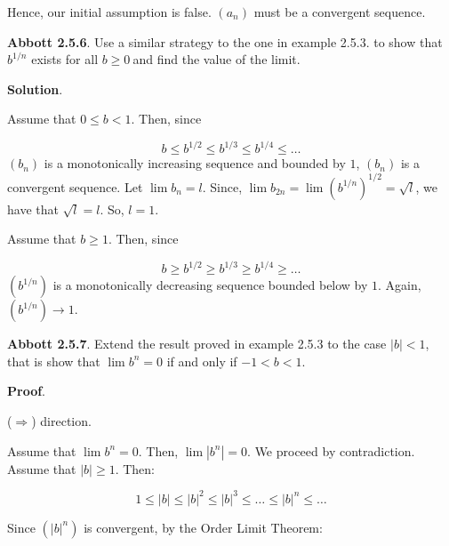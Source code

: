 \documentclass[10pt]{article}
\begin{document}
Hence, our initial assumption is false. $\displaystyle ( a_{n})$ must be a convergent sequence.



\textbf{Abbott 2.5.6}. Use a similar strategy to the one in example 2.5.3. to show that $\displaystyle b^{1/n}$ exists for all $\displaystyle b\geq 0\ $and find the value of the limit.



\textbf{Solution}.

Assume that $\displaystyle 0\leq b< 1$. Then, since 


\begin{equation*}
b\leq b^{1/2} \leq b^{1/3} \leq b^{1/4} \leq \dotsc 
\end{equation*}
$\displaystyle ( b_{n})$ is a monotonically increasing sequence and bounded by $\displaystyle 1$, $\displaystyle ( b_{n})$ is a convergent sequence. Let $\displaystyle \lim b_{n} =l$. Since, $\displaystyle \lim b_{2n} =\lim \left( b^{1/n}\right)^{1/2} =\sqrt{l}$, we have that $\displaystyle \sqrt{l} =l$. So, $\displaystyle l=1$.



Assume that $\displaystyle b\geq 1$. Then, since


\begin{equation*}
b\geq b^{1/2} \geq b^{1/3} \geq b^{1/4} \geq \dotsc 
\end{equation*}
$\displaystyle \left( b^{1/n}\right)$ is a monotonically decreasing sequence bounded below by $\displaystyle 1$. Again, $\displaystyle \left( b^{1/n}\right)\rightarrow 1$.



\textbf{Abbott 2.5.7}. Extend the result proved in example 2.5.3 to the case $\displaystyle |b|< 1$, that is show that $\displaystyle \lim b^{n} =0$ if and only if $\displaystyle -1< b< 1$.



\textbf{Proof}.

($\displaystyle \Longrightarrow $) direction.

Assume that $\displaystyle \lim b^{n} =0$. Then, $\displaystyle \lim |b^{n} |=0$. We proceed by contradiction. Assume that $\displaystyle |b|\geq 1$. Then:


\begin{equation*}
1\leq |b|\leq |b|^{2} \leq |b|^{3} \leq \dotsc \leq |b|^{n} \leq \dotsc 
\end{equation*}


Since $\displaystyle \left( |b|^{n}\right)$ is convergent, by the Order Limit Theorem:
\end{document}
